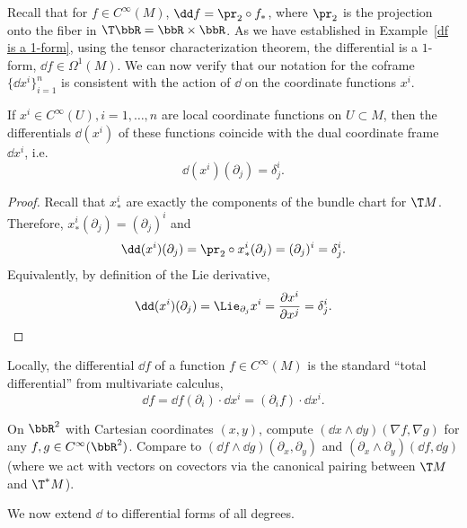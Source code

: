 Recall that for $f\in C^\infty(M)$, $\dd f=\pr_2\circ f_\ast$, where $\pr_2$ is the projection onto the fiber in $\T\bbR =\bbR \times\bbR $. As we have established in Example~\ref{df is a 1-form}, using the tensor characterization theorem, the differential is a $1$-form, $\dd f\in\Omega^1(M)$. We can now verify that our notation for the coframe $\{\dd x^i\}_{i=1}^n$ is consistent with the action of $\dd$ on the coordinate functions $x^i$.

\begin{prop}
    If $x^i\in C^\infty(U),i=1,\ldots,n$ are local coordinate functions on $U\subset M$, then the differentials $\dd (x^i)$ of these functions coincide with the dual coordinate frame $\dd x^i$, i.e.
    \[\dd (x^i)(\partial_j)=\delta^i_j.\]
\end{prop}
\begin{proof}
    Recall that $x^i_\ast$ are exactly the components of the bundle chart for $\T M$. Therefore, $x^i_\ast(\partial_j)=(\partial_j)^i$ and
    \[\dd (x^i)(\partial_{j})=\pr_2\circ x^i_\ast (\partial_{j})=(\partial_j)^i=\delta^i_j.\]
    Equivalently, by definition of the Lie derivative, 
    \[\dd (x^i)(\partial_j)=\Lie_{\partial_j}x^i=\frac{\partial x^i}{\partial x^j}=\delta^i_j.\]
\end{proof}
\begin{cor}
    Locally, the differential $\dd f$ of a function $f\in C^\infty(M)$ is the standard ``total differential'' from multivariate calculus, \[\dd f=\dd f(\partial_i)\cdot\dd x^i=(\partial_i f)\cdot \dd x^i.\]
\end{cor}

\begin{xca}
    On $\bbR^2$ with Cartesian coordinates $(x,y)$, compute $(\dd x\wedge \dd y)(\nabla f,\nabla g)$ for any $f,g\in C^\infty(\bbR^2)$. Compare to $(\dd f\wedge \dd g)(\partial_x,\partial_y)$ and $(\partial_x\wedge\partial_y)(\dd f,\dd g)$ (where we act with vectors on covectors via the canonical pairing between $\T M$ and $\T^\ast M$).
\end{xca}

We now extend $\dd$ to differential forms of all degrees.

